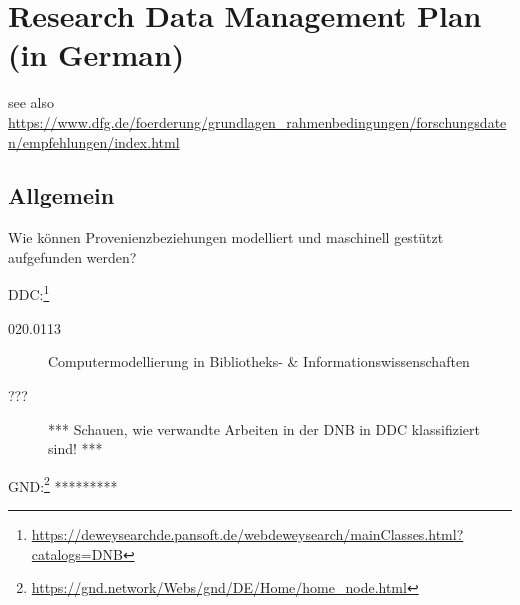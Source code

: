 \chapter{Research Data Management Plan (in German)}
\label{chap:DMP}


see also \url{https://www.dfg.de/foerderung/grundlagen_rahmenbedingungen/forschungsdaten/empfehlungen/index.html}


\newcommand{\nocontentsline}[3]{}
\newcommand{\tocless}[2]{\bgroup\let\addcontentsline=\nocontentsline#1{#2}\egroup}

\setcounter{secnumdepth}{\subsubsectionnumdepth}
\tocless\section{Allgemein}

\tocless\subsection{Thema}

\tocless\subsubsection{Wie lautet die primäre Forschungsfrage der Abschlussarbeit?}

Wie können Provenienzbeziehungen modelliert und maschinell gestützt aufgefunden werden?

\tocless\subsubsection{Bitte geben Sie einige Schlagwörter zur Forschungsfrage bzw. Fragestellung an.}

DDC:\footnote{\url{https://deweysearchde.pansoft.de/webdeweysearch/mainClasses.html?catalogs=DNB}}
%
\begin{description}
  \item[020.0113]
    Computermodellierung in Bibliotheks- \& Informationswissenschaften
  \item[???]
    *** Schauen, wie verwandte Arbeiten in der DNB in DDC klassifiziert sind! ***
\end{description}
GND:\footnote{\url{https://gnd.network/Webs/gnd/DE/Home/home_node.html}} *********


